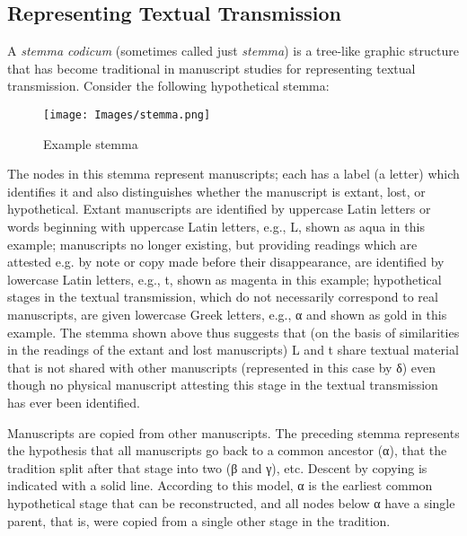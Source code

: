 \subsection[{Representing Textual Transmission}]{Representing Textual Transmission}\label{GDstem}\par
A \textit{stemma codicum} (sometimes called just \textit{stemma}) is a tree-like graphic structure that has become traditional in manuscript studies for representing textual transmission. Consider the following hypothetical stemma: \begin{figure}[htbp]
\noindent\texttt{[image: Images/stemma.png]}
\caption{Example stemma}\end{figure}
\par
The nodes in this stemma represent manuscripts; each has a label (a letter) which identifies it and also distinguishes whether the manuscript is extant, lost, or hypothetical. Extant manuscripts are identified by uppercase Latin letters or words beginning with uppercase Latin letters, e.g., L, shown as aqua in this example; manuscripts no longer existing, but providing readings which are attested e.g. by note or copy made before their disappearance, are identified by lowercase Latin letters, e.g., t, shown as magenta in this example; hypothetical stages in the textual transmission, which do not necessarily correspond to real manuscripts, are given lowercase Greek letters, e.g., α and shown as gold in this example. The stemma shown above thus suggests that (on the basis of similarities in the readings of the extant and lost manuscripts) L and t share textual material that is not shared with other manuscripts (represented in this case by δ) even though no physical manuscript attesting this stage in the textual transmission has ever been identified.\par
Manuscripts are copied from other manuscripts. The preceding stemma represents the hypothesis that all manuscripts go back to a common ancestor (α), that the tradition split after that stage into two (β and γ), etc. Descent by copying is indicated with a solid line. According to this model, α is the earliest common hypothetical stage that can be reconstructed, and all nodes below α have a single parent, that is, were copied from a single other stage in the tradition.\par
